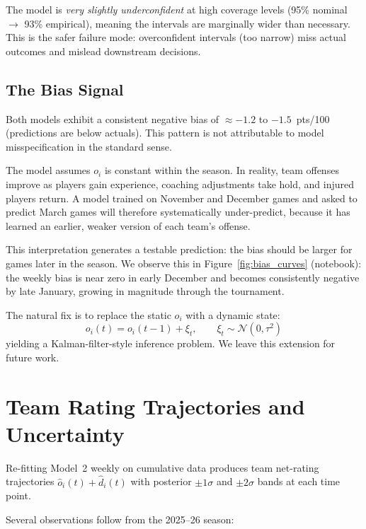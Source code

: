 \documentclass[11pt]{article}
\newcommand{\N}{\mathcal{N}}
\begin{document}
The model is \emph{very slightly underconfident} at high coverage levels (95\% nominal $\to$ 93\% empirical), meaning the intervals are marginally wider than necessary.  This is the safer failure mode: overconfident intervals (too narrow) miss actual outcomes and mislead downstream decisions.

\subsection{The Bias Signal}
\label{sec:bias}

Both models exhibit a consistent negative bias of $\approx -1.2$ to $-1.5$~pts/100
(predictions are below actuals).  This pattern is not attributable to model
misspecification in the standard sense.

The model assumes $o_i$ is constant within the season.  In reality, team
offenses improve as players gain experience, coaching adjustments take hold, and
injured players return.  A model trained on November and December games and
asked to predict March games will therefore systematically under-predict,
because it has learned an earlier, weaker version of each team's offense.

This interpretation generates a testable prediction: the bias should be larger
for games later in the season.  We observe this in Figure~\ref{fig:bias_curves}
(notebook): the weekly bias is near zero in early December and becomes
consistently negative by late January, growing in magnitude through the
tournament.

The natural fix is to replace the static $o_i$ with a dynamic state:
\begin{equation}
  o_i(t) = o_i(t-1) + \xi_t, \qquad \xi_t \sim \N(0, \tau^2)
  \label{eq:dynamic}
\end{equation}
yielding a Kalman-filter-style inference problem.  We leave this extension for
future work.

\section{Team Rating Trajectories and Uncertainty}

Re-fitting Model~2 weekly on cumulative data produces team net-rating
trajectories $\hat{o}_i(t) + \hat{d}_i(t)$ with posterior $\pm 1\sigma$ and
$\pm 2\sigma$ bands at each time point.

Several observations follow from the 2025--26 season:
\end{document}
